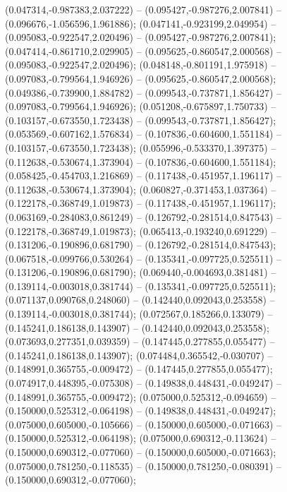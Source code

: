  (0.047314,-0.987383,2.037222) -- (0.095427,-0.987276,2.007841) -- (0.096676,-1.056596,1.961886);
 (0.047141,-0.923199,2.049954) -- (0.095083,-0.922547,2.020496) -- (0.095427,-0.987276,2.007841);
 (0.047414,-0.861710,2.029905) -- (0.095625,-0.860547,2.000568) -- (0.095083,-0.922547,2.020496);
 (0.048148,-0.801191,1.975918) -- (0.097083,-0.799564,1.946926) -- (0.095625,-0.860547,2.000568);
 (0.049386,-0.739900,1.884782) -- (0.099543,-0.737871,1.856427) -- (0.097083,-0.799564,1.946926);
 (0.051208,-0.675897,1.750733) -- (0.103157,-0.673550,1.723438) -- (0.099543,-0.737871,1.856427);
 (0.053569,-0.607162,1.576834) -- (0.107836,-0.604600,1.551184) -- (0.103157,-0.673550,1.723438);
 (0.055996,-0.533370,1.397375) -- (0.112638,-0.530674,1.373904) -- (0.107836,-0.604600,1.551184);
 (0.058425,-0.454703,1.216869) -- (0.117438,-0.451957,1.196117) -- (0.112638,-0.530674,1.373904);
 (0.060827,-0.371453,1.037364) -- (0.122178,-0.368749,1.019873) -- (0.117438,-0.451957,1.196117);
 (0.063169,-0.284083,0.861249) -- (0.126792,-0.281514,0.847543) -- (0.122178,-0.368749,1.019873);
 (0.065413,-0.193240,0.691229) -- (0.131206,-0.190896,0.681790) -- (0.126792,-0.281514,0.847543);
 (0.067518,-0.099766,0.530264) -- (0.135341,-0.097725,0.525511) -- (0.131206,-0.190896,0.681790);
 (0.069440,-0.004693,0.381481) -- (0.139114,-0.003018,0.381744) -- (0.135341,-0.097725,0.525511);
 (0.071137,0.090768,0.248060) -- (0.142440,0.092043,0.253558) -- (0.139114,-0.003018,0.381744);
 (0.072567,0.185266,0.133079) -- (0.145241,0.186138,0.143907) -- (0.142440,0.092043,0.253558);
 (0.073693,0.277351,0.039359) -- (0.147445,0.277855,0.055477) -- (0.145241,0.186138,0.143907);
 (0.074484,0.365542,-0.030707) -- (0.148991,0.365755,-0.009472) -- (0.147445,0.277855,0.055477);
 (0.074917,0.448395,-0.075308) -- (0.149838,0.448431,-0.049247) -- (0.148991,0.365755,-0.009472);
 (0.075000,0.525312,-0.094659) -- (0.150000,0.525312,-0.064198) -- (0.149838,0.448431,-0.049247);
 (0.075000,0.605000,-0.105666) -- (0.150000,0.605000,-0.071663) -- (0.150000,0.525312,-0.064198);
 (0.075000,0.690312,-0.113624) -- (0.150000,0.690312,-0.077060) -- (0.150000,0.605000,-0.071663);
 (0.075000,0.781250,-0.118535) -- (0.150000,0.781250,-0.080391) -- (0.150000,0.690312,-0.077060);
